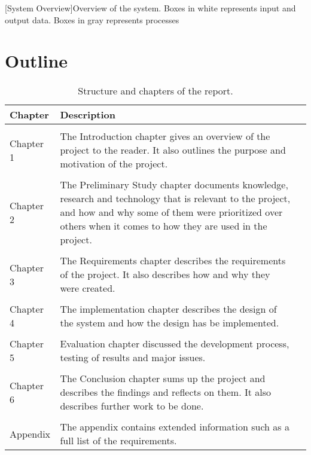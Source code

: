\begin{center}
    [System Overview]{Overview of the system. Boxes in white represents input and output data. Boxes in gray represents processes}
  \end{center}

\section{Outline}
\begin{table}[H]
  \centering
  \begin{tabularx}{\textwidth}{ l X l }
    \textbf{Chapter}      & \textbf{Description} \\
    \hline \\ [-1.5ex]
    Chapter 1 & The Introduction chapter gives an overview of the project to the reader. It also outlines the purpose and motivation of the project. \\
    \hline \\ [-1.5ex]
    Chapter 2 & The Preliminary Study chapter documents knowledge, research and technology that is relevant to the project, and how and why some of them were prioritized over others when it comes to how they are used in the project. \\
    \hline \\ [-1.5ex]
    Chapter 3 & The Requirements chapter describes the requirements of the project. It also describes how and why they were created. \\
    \hline \\ [-1.5ex]
    Chapter 4 & The implementation chapter describes the design of the system and how the design has be implemented. \\
    \hline \\ [-1.5ex]
    Chapter 5 & Evaluation chapter discussed the development process, testing of results and major issues. \\
    \hline \\ [-1.5ex]
    Chapter 6 & The Conclusion chapter sums up the project and describes the findings and reflects on them. It also describes further work to be done. \\
    \hline \\ [-1.5ex]
    Appendix & The appendix contains extended information such as a full list of the requirements. \\
  \end{tabularx}
  \caption{Structure and chapters of the report.}
  \label{table-reportstructure}
\end{table}
